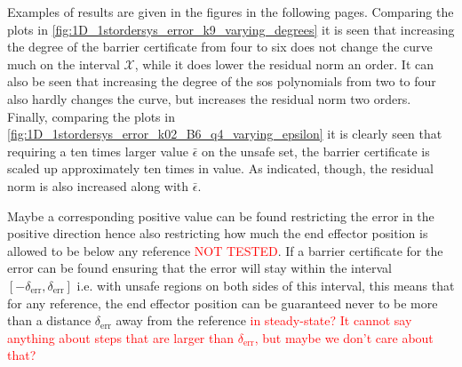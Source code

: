 Examples of results are given in the figures in the following pages. Comparing the plots in \autoref{fig:1D_1stordersys_error_k9_varying_degrees} it is seen that increasing the degree of the barrier certificate from four to six does not change the curve much on the interval $\mathcal{X}$, while it does lower the residual norm an order. It can also be seen that increasing the degree of the \gls{sos} polynomials from two to four also hardly changes the curve, but increases the residual norm two orders. Finally, comparing the plots in  \autoref{fig:1D_1stordersys_error_k02_B6_q4_varying_epsilon} it is clearly seen that requiring a ten times larger value  $\bar{\epsilon}$ on the unsafe set, the barrier certificate is scaled up approximately ten times in value. As indicated, though, the residual norm is also increased along with $\bar{\epsilon}$.

Maybe a corresponding positive value can be found restricting the error in the positive direction hence also restricting how much the end effector position is allowed to be below any reference \textcolor{red}{NOT TESTED}. If a barrier certificate for the error can be found ensuring that the error will stay within the interval $[-\delta_\text{err},\delta_\text{err}]$ i.e. with unsafe regions on both sides of this interval, this means that for any reference, the end effector position can be guaranteed never to be more than a distance $\delta_\text{err}$ away from the reference \textcolor{red}{in steady-state? It cannot say anything about steps that are larger than $\delta_\text{err}$, but maybe we don't care about that?}





